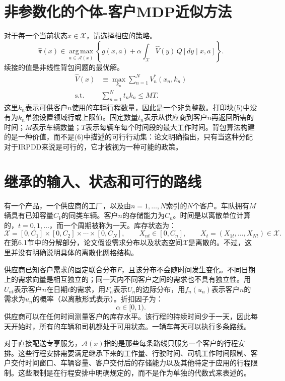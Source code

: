 \documentclass{article}
\begin{document}
\section*{非参数化的个体-客户MDP近似方法}

对于每一个当前状态$x\in\mathcal X$，请选择相应的策略。
\begin{equation}
\hat\pi(x)\in\operatorname*{arg\,max}_{a\in\mathcal A(x)}
\left\{g(x,a)+\alpha\int_{\mathcal X}\hat V(y)\,Q[dy\mid x,a]\right\}.
\tag{6}
\end{equation}
续接的值是非线性背包问题的最优解。
\begin{equation}
\begin{aligned}
\hat V(x)&\equiv\max_{k_n}\sum_{n=1}^{N}V_n^*(x_n,k_n)\\
\text{s.t.}\quad&\sum_{n=1}^{N}t_nk_n\leq MT.
\end{aligned}
\tag{5}
\end{equation}
这里$k_n$表示可供客户$n$使用的车辆行程数量，因此是一个非负整数。打印块(5)中没有为$k_n$单独设置领域行或上限值。固定数量$t_n$表示从供应商到客户$n$再返回所需的时间；$M$表示车辆数量；$T$表示每辆车每个时间段的最大工作时间。背包算法构建的是一种价值，而不是(6)中描述的可行行动集：论文明确指出，只有当这种分配对于IRPDD来说是可行的，它才被视为一种可能的政策。

\section*{继承的输入、状态和可行的路线}

有一个产品，一个供应商的工厂，以及由$n=1,\ldots,N$索引的$N$个客户。车队拥有$M$辆具有已知容量$C_V$的同类车辆。客户$n$的存储能力为$C_n$。时间是以离散单位计算的，$t=0,1,\ldots$，而一个周期被称为一天。库存状态为：
\[
\mathcal X=[0,C_1]\times[0,C_2]\times\cdots\times[0,C_N],\qquad
X_{nt}\in[0,C_n],\qquad
X_t=(X_{1t},\ldots,X_{Nt})\in\mathcal X.
\]
在第6.1节中的分解部分，论文假设需求分布以及状态空间$\mathcal X$是离散的。不过，这里并没有明确说明具体的离散化网格结构。

供应商已知客户需求的固定联合分布$F$，且该分布不会随时间发生变化。不同日期上的需求向量是相互独立的；同一天内不同客户之间的需求也不具有独立性。用$U_{nt}$表示客户$n$在日期$t$的需求，用$F_n$表示$U_n$的边际分布，用$f_n(u_n)$表示客户$n$的需求为$u_n$的概率（以离散形式表示）。折扣因子为：
\[
\alpha\in[0,1).
\]
供应商可以在任何时间测量客户的库存水平。该行程的持续时间少于一天，因此每天开始时，所有的车辆和司机都处于可用状态。一辆车每天可以执行多条路线。

对于直接配送专享服务，$\mathcal A(x)$指的是那些每条路线只服务一个客户的行程安排。这些行程安排需要满足继承下来的工作量、行驶时间、司机工作时间限制、客户交付时间窗口、车辆容量、客户交付后的存储能力以及其他特定于应用的行程限制。这些限制是在行程安排中明确规定的，而不是作为单独的代数式来表述的。
\end{document}
